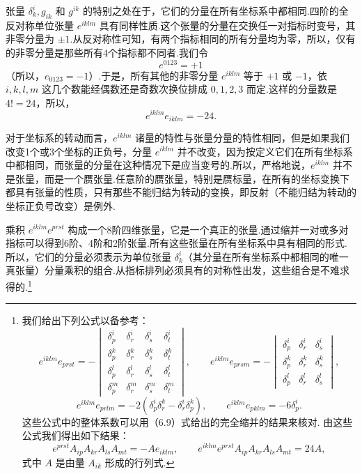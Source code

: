 张量 $\delta^i_k,g_{ik}$ 和 $g^{ik}$ 的特别之处在于，它们的分量在所有坐标系中都相同.四阶的全反对称单位张量 $e^{iklm}$ 具有同样性质.这个张量的分量在交换任一对指标时变号，其非零分量为 $\pm 1$.从反对称性可知，有两个指标相同的所有分量均为零，所以，仅有的非零分量是那些所有4个指标都不同者.我们令
\begin{equation}
  e^{0123}=+1
\end{equation}
（所以，$e_{0123}=-1$）.于是，所有其他的非零分量 $e^{iklm}$ 等于 $+1$ 或 $-1$，依 $i,k,l,m$ 这几个数能经偶数还是奇数次换位排成 $0,1,2,3$ 而定.这样的分量数是 $4!=24$，所以，
\begin{equation}
  e^{iklm}e_{iklm}=-24.
\end{equation}

对于坐标系的转动而言，$e^{iklm}$ 诸量的特性与张量分量的特性相同，但是如果我们改变1个或3个坐标的正负号，分量 $e^{iklm}$ 并不改变，因为按定义它们在所有坐标系中都相同，而张量的分量在这种情况下是应当变号的.所以，严格地说，$e^{iklm}$ 并不是张量，而是一个赝张量.任意阶的赝张量，特别是赝标量，在所有的坐标变换下都具有张量的性质，只有那些不能归结为转动的变换，即反射（不能归结为转动的坐标正负号改变）是例外.

乘积 $e^{iklm}e^{prst}$ 构成一个8阶四维张量，它是一个真正的张量.通过缩并一对或多对指标可以得到6阶、4阶和2阶张量.所有这些张量在所有坐标系中具有相同的形式.所以，它们的分量必须表示为单位张量 $\delta^i_k$（其分量在所有坐标系中都相同的唯一真张量）分量乘积的组合.从指标排列必须具有的对称性出发，这些组合是不难求得的.\footnote{我们给出下列公式以备参考：
\begin{equation*}
  e^{iklm}e_{prst}=-\begin{vmatrix}
    \delta^i_p & \delta^i_r & \delta^i_s & \delta^i_t\\
    \delta^k_p & \delta^k_r & \delta^k_s & \delta^k_t\\
    \delta^l_p & \delta^l_r & \delta^l_s & \delta^l_t\\
    \delta^m_p & \delta^m_r & \delta^m_s & \delta^m_t
  \end{vmatrix},\qquad
  e^{iklm}e_{prsm}=-\begin{vmatrix}
    \delta^i_p & \delta^i_r & \delta^i_s\\
    \delta^k_p & \delta^k_r & \delta^k_s\\
    \delta^l_p & \delta^l_r & \delta^l_s
  \end{vmatrix},
\end{equation*}
\begin{equation*}
  e^{iklm}e_{prlm}=-2(\delta^i_p\delta^k_r-\delta^i_r\delta^k_p),\qquad
  e^{iklm}e_{pklm}=-6\delta^i_p.
\end{equation*}
这些公式中的整体系数可以用（6.9）式给出的完全缩并的结果来核对.
由这些公式我们得出如下结果：
\begin{equation*}
  e^{prst}A_{ip}A_{kr}A_{ls}A_{mt}=-Ae_{iklm},\qquad
  e^{iklm}e^{prst}A_{ip}A_{kr}A_{ls}A_{mt}=24A,
\end{equation*}
式中 $A$ 是由量 $A_{ik}$ 形成的行列式.}

